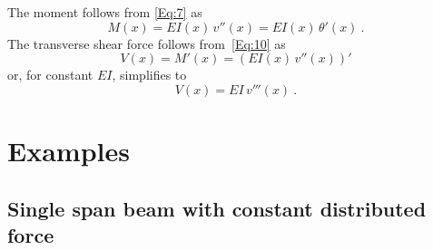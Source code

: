 \documentclass[11pt, oneside]{article}   	%
\begin{document}
The moment follows from \eqref{Eq:7} as
\begin{equation}
	M(x) = EI(x)\, v''(x) = EI(x)\, \theta'(x) ~.
	\label{Eq:14}
\end{equation}
The transverse shear force follows from~\eqref{Eq:10} as
\begin{equation}
	V(x) = M'(x) = \left( EI(x)\, v''(x) \right)'
	\label{Eq:15}
\end{equation}
or, for constant $EI$, simplifies to
\begin{equation}
	V(x) = EI\, v'''(x) ~.
	\label{Eq:16}
\end{equation}

\section{Examples}

\subsection{Single span beam with constant distributed force}
\end{document}

